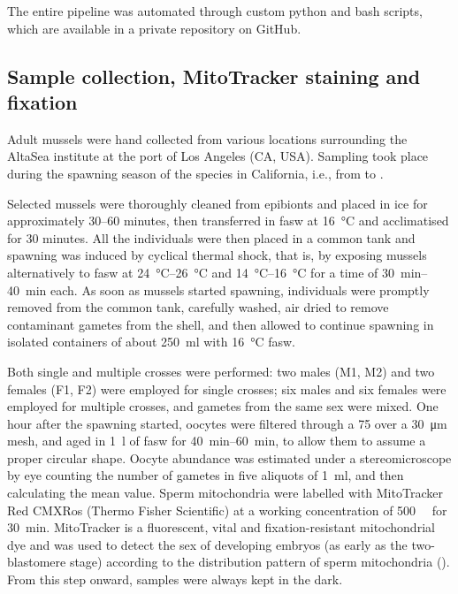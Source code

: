 The entire pipeline was automated through custom python and bash scripts, which are available in a private repository on GitHub.

\subsection{Sample collection, MitoTracker staining and fixation}
Adult mussels were hand collected from various locations surrounding the AltaSea institute at the port of Los Angeles (CA, USA). Sampling took place during the spawning season of the species in California, i.e., from  to .

Selected mussels were thoroughly cleaned from epibionts and placed in ice for approximately 30--60 minutes, then transferred in \gls{fasw} at \qty{16}{\degreeCelsius} and acclimatised for 30 minutes. All the individuals were then placed in a common tank and spawning was induced by cyclical thermal shock, that is, by exposing mussels alternatively to \gls{fasw} at \qtyrange{24}{26}{\degreeCelsius} and \qtyrange{14}{16}{\degreeCelsius} for a time of \qtyrange{30}{40}{\minute} each. As soon as mussels started spawning, individuals were promptly removed from the common tank, carefully washed, air dried to remove contaminant gametes from the shell, and then allowed to continue spawning in isolated containers of about \qty{250}{\ml} with \qty{16}{\degreeCelsius} \gls{fasw}.

Both single and multiple crosses were performed: two males (M1, M2) and two females (F1, F2) were employed for single crosses; six males and six females were employed for multiple crosses, and gametes from the same sex were mixed. One hour after the spawning started, oocytes were filtered through a \num{75} over a \qty{30}{\um} mesh, and aged in \qty{1}{\l} of \gls{fasw} for \qtyrange{40}{60}{\minute}, to allow them to assume a proper circular shape. Oocyte abundance was estimated under a stereomicroscope by eye counting the number of gametes in five aliquots of \qty{1}{\ml}, and then calculating the mean value. Sperm mitochondria were labelled with MitoTracker Red CMXRos (Thermo Fisher Scientific) at a working concentration of \qty{500}{\nano\molar} for \qty{30}{\minute}. MitoTracker is a fluorescent, vital and fixation-resistant mitochondrial dye and was used to detect the sex of developing embryos (as early as the two-blastomere stage) according to the distribution pattern of sperm mitochondria (). From this step onward, samples were always kept in the dark.

